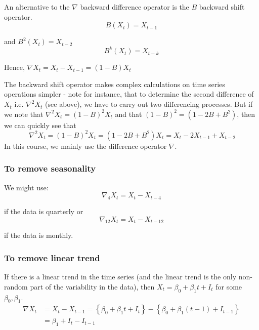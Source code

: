 \documentclass[12pt,a4paper,openany,twoside]{report}
\theoremstyle{definition}
\theoremstyle{remark}
\theoremstyle{plain}
\theoremstyle{definition}
\theoremstyle{definition}
\theoremstyle{definition}
\theoremstyle{remark}
\begin{document}
An alternative to the \(\nabla\) backward difference operator is the \(B\) backward shift operator.
\[B\left( X_{t} \right) = X_{t - 1}\]

and \(B^{2}\left( X_{t} \right) = X_{t - 2}\)
\[B^{k}\left( X_{t} \right) = X_{t - k}\]

Hence, \(\nabla X_{t} = X_{t} - X_{t - 1} = (1 - B)X_{t}\)

The backward shift operator makes complex calculations on time series
operations simpler - note for instance, that to determine the second
difference of \(X_{t}\) i.e. \(\nabla^{2}X_{t}\) (see above), we have to
carry out two differencing processes. But if we note that
\(\nabla^{2}X_{t} = (1 - B)^{2}X_{t}\) and that
\((1 - B)^{2} = (1 - 2B + B^{2})\), then we can quickly see that
\[\ \nabla^{2}X_{t} = (1 - B)^{2}X_{t} = (1 - 2B + B^{2})X_{t} = X_{t} - 2X_{t - 1} + X_{t - 2}\]
In this course, we mainly use the difference operator \(\nabla\).

\hypertarget{to-remove-seasonality}{%
\subsubsection*{To remove seasonality}\label{to-remove-seasonality}}

We might use:
\[\nabla_{4}X_{t} = X_{t} - X_{t - 4}\]

if the data is quarterly or
\[\nabla_{12}X_{t} = X_{t} - X_{t - 12}\]

if the data is monthly.

\hypertarget{to-remove-linear-trend}{%
\subsubsection*{To remove linear trend}\label{to-remove-linear-trend}}

If there is a linear trend in the time series (and the linear trend is the only non-random part of the
variability in the data), then
\(X_{t} = \beta_{0} + \beta_{1}t + I_{t}\) for some
\(\beta_{0},\beta_{1}.\)
\begin{align}
\nabla X_{t} & = X_{t} - X_{t - 1} = \left\{ \beta_{0} + \beta_{1}t + I_{t} \right\} - \left\{ 
\beta_{0} + \beta_{1}\left( t - 1 \right) + I_{t - 1} \right\}  \\
             & = \beta_{1} + I_{t} - I_{t - 1}
\end{align}
\end{document}
